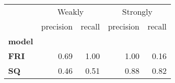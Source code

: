 \begin{tabular}{lrrrr}
\toprule
{} & \multicolumn{2}{c}{Weakly} & \multicolumn{2}{c}{Strongly} \\
{} & precision & recall & precision & recall \\
\textbf{model} &           &        &           &        \\
\midrule
\textbf{FRI  } &      0.69 &   1.00 &      1.00 &   0.16 \\
\textbf{SQ   } &      0.46 &   0.51 &      0.88 &   0.82 \\
\bottomrule
\end{tabular}
